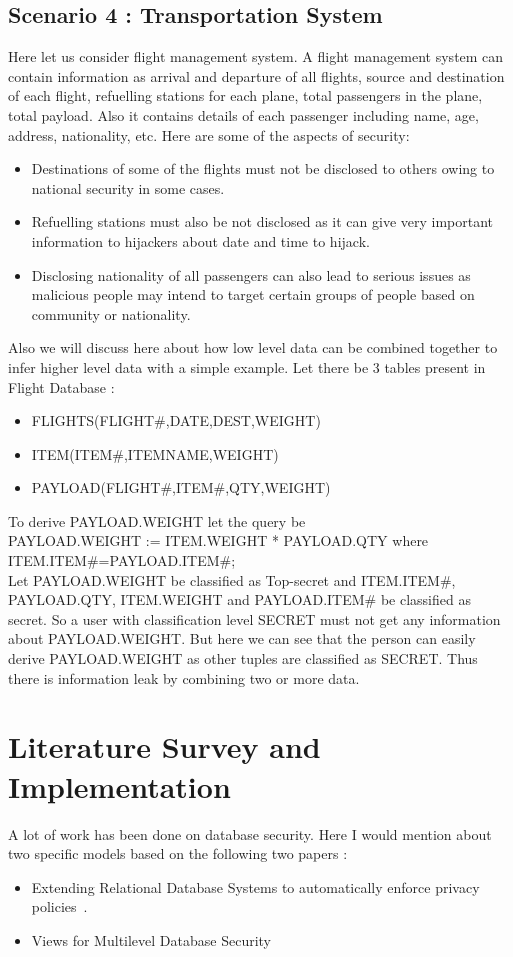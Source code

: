 \documentclass[11pt,a4paper]{report}
\begin{document}
\section{Scenario 4 : Transportation System}
Here let us consider flight management system. A flight management system can contain information as arrival and departure of all flights, source and destination of each flight, refuelling stations for each plane, total passengers in the plane, total payload. Also it contains details of each passenger including name, age, address, nationality, etc. Here are some of the aspects of security: 
\begin{itemize}
    \item Destinations of some of the flights must not be disclosed to others owing to national security in some cases.
    \item Refuelling stations must also be not disclosed as it can give very important information to hijackers about date and time to hijack.
    \item Disclosing nationality of all passengers can also lead to serious issues as malicious people may intend to target certain groups of people based on community or nationality.
\end{itemize}
Also we will discuss here about how low level data can be combined together to infer higher level data with a simple example. Let there be 3 tables present in Flight Database :
\begin{itemize}
\item FLIGHTS(FLIGHT\#,DATE,DEST,WEIGHT)
\item ITEM(ITEM\#,ITEMNAME,WEIGHT)
\item PAYLOAD(FLIGHT\#,ITEM\#,QTY,WEIGHT)
\end{itemize}
To derive PAYLOAD.WEIGHT let the query be\\[2em] 
PAYLOAD.WEIGHT := ITEM.WEIGHT * PAYLOAD.QTY where ITEM.ITEM\#=PAYLOAD.ITEM\#; \\[2em]

Let PAYLOAD.WEIGHT be classified as Top-secret and ITEM.ITEM\#, PAYLOAD.QTY, ITEM.WEIGHT and PAYLOAD.ITEM\# be classified as secret. So a user with classification level SECRET must not get any information about PAYLOAD.WEIGHT. But here we can see that the person can easily derive PAYLOAD.WEIGHT as other tuples are classified as SECRET. Thus there is information leak by combining two or more data. 
\chapter{Literature Survey and Implementation}
A lot of work has been done on database security. Here I would mention about two specific models based on the following two papers : 
\begin{itemize}
    \item Extending Relational Database Systems to automatically enforce privacy policies~\cite{Someone2000}.
    
    \item Views for Multilevel Database Security~\cite{Someone2001}
\end{itemize}
\end{document}
